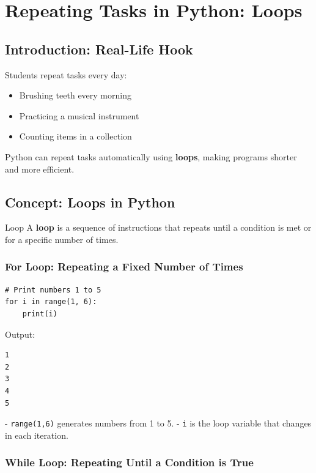 \chapter{Repeating Tasks in Python: Loops}

\section{Introduction: Real-Life Hook}

Students repeat tasks every day:  

\begin{itemize}
    \item Brushing teeth every morning  
    \item Practicing a musical instrument  
    \item Counting items in a collection  
\end{itemize}

Python can repeat tasks automatically using \textbf{loops}, making programs shorter and more efficient.

\section{Concept: Loops in Python}

\begin{definition}{Loop}
A \textbf{loop} is a sequence of instructions that repeats until a condition is met or for a specific number of times.
\end{definition}

\subsection{For Loop: Repeating a Fixed Number of Times}

\begin{verbatim}
# Print numbers 1 to 5
for i in range(1, 6):
    print(i)
\end{verbatim}

Output:

\begin{verbatim}
1
2
3
4
5
\end{verbatim}

- \texttt{range(1,6)} generates numbers from 1 to 5.  
- \texttt{i} is the loop variable that changes in each iteration.

\subsection{While Loop: Repeating Until a Condition is True}


